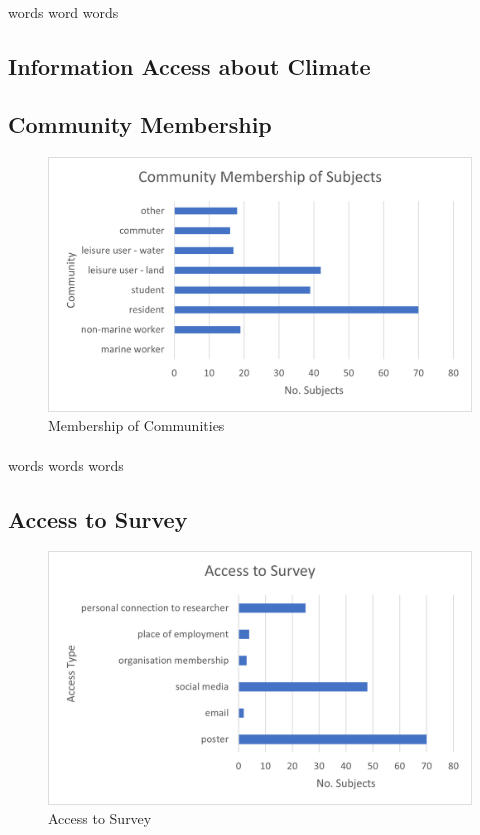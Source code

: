 \paragraph{}
words word words



\subsection{Information Access about Climate}

\subsection{Community Membership}

\begin{figure}[h]
    \centering
    \includegraphics{fig_results/com-mem-horizontal.png}
    \caption{Membership of Communities}
    \label{fig:my_label}
\end{figure}
\paragraph{}
words words words 
\subsection{Access to Survey}

\begin{figure}[h]
    \centering
    \includegraphics{fig_results/access_survey.png}
    \caption{Access to Survey}
    \label{fig:my_label}
\end{figure}
